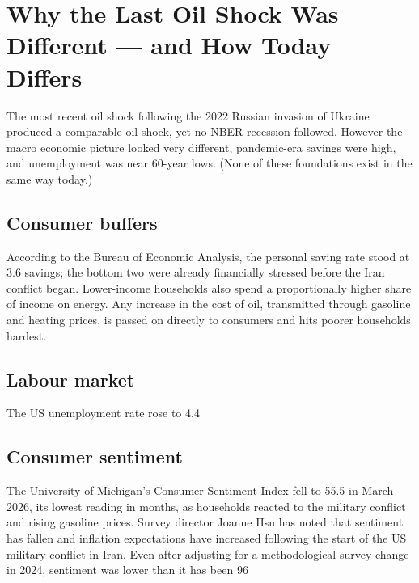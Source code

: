 \documentclass[12pt,a4paper]{article}
\begin{document}
\section{Why the Last Oil Shock Was Different --- and How Today Differs }

The most recent oil shock following the 2022 Russian invasion of Ukraine produced a comparable oil shock, yet no NBER recession followed. However the macro economic picture looked very different, pandemic-era savings were high, and unemployment was near 60-year lows. (None of these foundations exist in the same way today.)

\subsection{Consumer buffers}
According to the Bureau of Economic Analysis, the personal saving rate stood at 3.6%
savings; the bottom two were already financially stressed before the Iran conflict began.
Lower-income households also spend a proportionally higher share of income on energy. Any increase in the cost of oil, transmitted through gasoline and heating prices, is passed on directly to consumers and hits poorer households hardest.
\subsection{Labour market}
The US unemployment rate rose to 4.4%

\subsection{Consumer sentiment}
The University of Michigan’s Consumer Sentiment Index fell to 55.5 in March 2026, its lowest reading in months, as households reacted to the military conflict and rising gasoline prices. Survey director Joanne Hsu has noted that sentiment has fallen and inflation expectations have increased following the start of the US military conflict in Iran. Even after adjusting for a methodological survey change in 2024, sentiment was lower than it has been 96%
\end{document}

